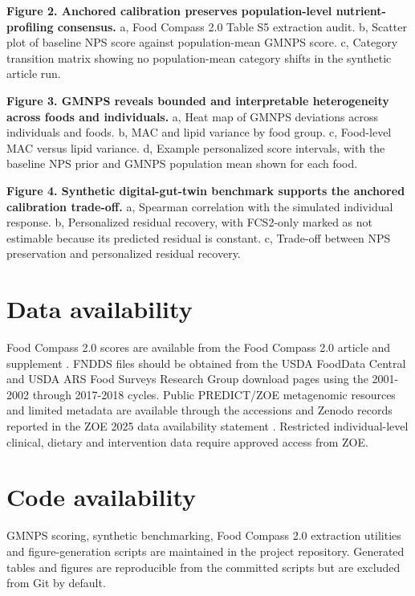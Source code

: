 \textbf{Figure 2. Anchored calibration preserves population-level
nutrient-profiling consensus.} a, Food Compass 2.0 Table S5 extraction audit.
b, Scatter plot of baseline NPS score against population-mean GMNPS score.
c, Category transition matrix showing no population-mean category shifts in the
synthetic article run.

\textbf{Figure 3. GMNPS reveals bounded and interpretable heterogeneity across
foods and individuals.} a, Heat map of GMNPS deviations across individuals and
foods. b, MAC and lipid variance by food group. c, Food-level MAC versus lipid
variance. d, Example personalized score intervals, with the baseline NPS prior
and GMNPS population mean shown for each food.

\textbf{Figure 4. Synthetic digital-gut-twin benchmark supports the anchored
calibration trade-off.} a, Spearman correlation with the simulated individual
response. b, Personalized residual recovery, with FCS2-only marked as not
estimable because its predicted residual is constant. c, Trade-off between NPS
preservation and personalized residual recovery.

\section*{Data availability}

Food Compass 2.0 scores are available from the Food Compass 2.0 article and
supplement \cite{barrett2024foodcompass2}. FNDDS files should be obtained from
the USDA FoodData Central and USDA ARS Food Surveys Research Group download
pages using the 2001-2002 through 2017-2018 cycles. Public PREDICT/ZOE
metagenomic resources and limited metadata are available through the accessions
and Zenodo records reported in the ZOE 2025 data availability statement
\cite{asnicar2025gut}. Restricted individual-level clinical, dietary and
intervention data require approved access from ZOE.

\section*{Code availability}

GMNPS scoring, synthetic benchmarking, Food Compass 2.0 extraction utilities and
figure-generation scripts are maintained in the project repository. Generated
tables and figures are reproducible from the committed scripts but are excluded
from Git by default.
